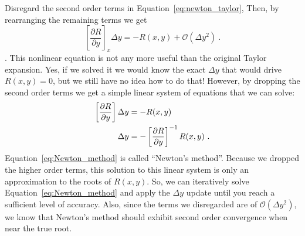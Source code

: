 \documentclass[conf]{new-aiaa}
\begin{document}
Disregard the second order terms in Equation~\eqref{eq:newton_taylor},
Then, by rearranging the remaining terms we get
\begin{equation}
    \left[ \frac{\partial R}{\partial y} \right]_{x} \Delta y = - R(x,y) + \mathcal{O}( \Delta y^2) \ .
\end{equation}. 
This nonlinear equation is not any more useful than the original Taylor expansion. 
Yes, if we solved it we would know the exact $\Delta y$ that would drive $R(x,y)=0$, 
but we still have no idea how to do that!
However, by dropping the second order terms we get a simple linear system of equations that we can solve: 
\begin{align}
    \left[ \frac{\partial R}{\partial y} \right] \Delta y &= - R(x,y) \notag \\
     \Delta y &= - \left[ \frac{\partial R}{\partial y} \right]^{-1} R(x,y)  \ .
    \label{eq:Newton_method}
\end{align}
Equation~\eqref{eq:Newton_method} is called ``Newton's method''. 
Because we dropped the higher order terms, this solution to this linear system is only an approximation to the roots of $R(x,y)$. 
So, we can iteratively solve Equation~\eqref{eq:Newton_method} and apply the $\Delta y$ update until you reach a sufficient level of accuracy. 
Also, since the terms we disregarded are of $\mathcal{O}( \Delta y^2)$, we know that Newton's method should exhibit second order convergence when near the true root. 
\end{document}
